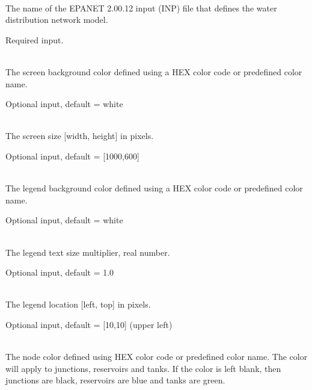\begin{description}[topsep=0pt,parsep=0.5em,itemsep=-0.4em]
  \item[{network}]\hfill
  \begin{description}[topsep=0pt,parsep=0.5em,itemsep=-0.4em]
    \item[{epanet file}]\hfill
\\ The name of the EPANET 2.00.12 input (INP) file that defines the water distribution
                network model.
                
                Required input.
  \end{description}
  \item[{visualization}]\hfill
  \begin{description}[topsep=0pt,parsep=0.5em,itemsep=-0.4em]
    \item[{screen}]\hfill
    \begin{description}[topsep=0pt,parsep=0.5em,itemsep=-0.4em]
      \item[{color}]\hfill
\\The screen background color defined using a HEX color code or predefined color name.
                
                Optional input, default = white
      \item[{size}]\hfill
\\The screen size [width, height] in pixels.
                
                Optional input, default = [1000,600]
    \end{description}
    \item[{legend}]\hfill
    \begin{description}[topsep=0pt,parsep=0.5em,itemsep=-0.4em]
      \item[{color}]\hfill
\\The legend background color defined using a HEX color code or predefined color name.
                
                Optional input, default = white
      \item[{scale}]\hfill
\\The legend text size multiplier, real number.
                
                Optional input, default = 1.0
      \item[{location}]\hfill
\\The legend location [left, top] in pixels.
                
                Optional input, default = [10,10] (upper left)
    \end{description}
    \item[{nodes}]\hfill
    \begin{description}[topsep=0pt,parsep=0.5em,itemsep=-0.4em]
      \item[{color}]\hfill
\\The node color defined using HEX color code or predefined color name.
                The color will apply to junctions, reservoirs and tanks. If the 
                color is left blank, then junctions are black, reservoirs are 
                blue and tanks are green.
                

\end{description}
\end{description}
\end{description}

